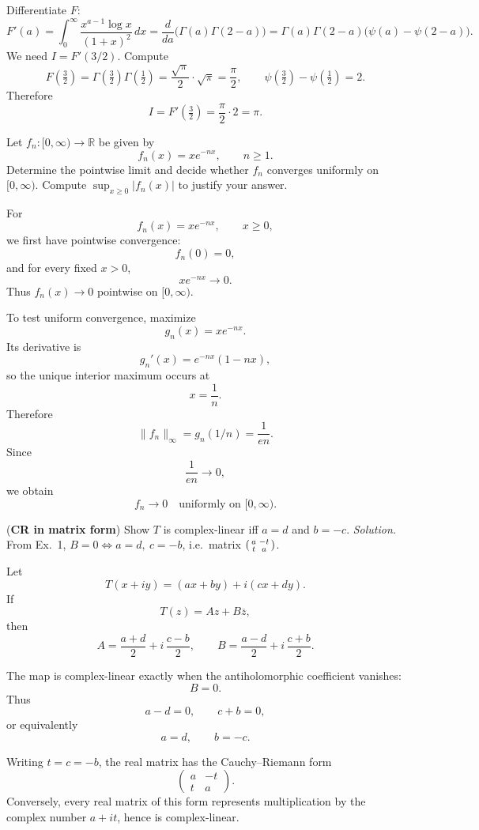 \begin{solution}
Differentiate \(F\):
\[
F'(a)=\int_{0}^{\infty}\frac{x^{a-1}\log x}{(1+x)^2}\,dx
=\frac{d}{da}\big(\Gamma(a)\Gamma(2-a)\big)
=\Gamma(a)\Gamma(2-a)\big(\psi(a)-\psi(2-a)\big).
\]
We need \(I=F'(3/2)\).  Compute
\[
F\!\left(\tfrac32\right)
=\Gamma\!\left(\tfrac32\right)\Gamma\!\left(\tfrac12\right)
=\frac{\sqrt\pi}{2}\cdot\sqrt\pi=\frac{\pi}{2},
\qquad
\psi\!\left(\tfrac32\right)-\psi\!\left(\tfrac12\right)=2.
\]
Therefore
\[
I=F'\!\left(\tfrac32\right)
=\frac{\pi}{2}\cdot 2
=\boxed{\pi}.
\]

\bigskip
\end{solution}

\begin{problem}[CP-IV-0050]
\label{prob:cp-iv-0050}
Let $f_n:[0,\infty)\to\mathbb R$ be given by
\[
f_n(x)=x e^{-nx},\qquad n\ge1.
\]
Determine the pointwise limit and decide whether $f_n$ converges uniformly
on $[0,\infty)$. Compute $\sup_{x\ge0}|f_n(x)|$ to justify your answer.
\end{problem}

\begin{solution}
For
\[
f_n(x)=xe^{-nx},
\qquad x\ge0,
\]
we first have pointwise convergence:
\[
f_n(0)=0,
\]
and for every fixed \(x>0\),
\[
xe^{-nx}\longrightarrow0.
\]
Thus \(f_n(x)\to0\) pointwise on \([0,\infty)\).

To test uniform convergence, maximize
\[
g_n(x)=xe^{-nx}.
\]
Its derivative is
\[
g_n'(x)=e^{-nx}(1-nx),
\]
so the unique interior maximum occurs at
\[
x=\frac1n.
\]
Therefore
\[
\|f_n\|_\infty
=
g_n(1/n)
=
\frac1{en}.
\]
Since
\[
\frac1{en}\longrightarrow0,
\]
we obtain
\[
\boxed{
f_n\to0\quad\text{uniformly on }[0,\infty).
}
\]
\end{solution}


\begin{problem}[CP-IV-0054]
\label{prob:cp-iv-0054}
\par\noindent\textbullet\quad (\textbf{CR in matrix form})
	Show $T$ is complex-linear iff $a=d$ and $b=-c$.
	\emph{Solution.} From Ex.\ 1, $B=0\iff a=d,\ c=-b$, i.e.\ matrix $\begin{psmallmatrix}a&-t\\ t&a\end{psmallmatrix}$.
\end{problem}

\begin{solution}
Let
\[
T(x+iy)=(ax+by)+i(cx+dy).
\]
If
\[
T(z)=Az+B\overline z,
\]
then
\[
A=\frac{a+d}{2}+i\,\frac{c-b}{2},
\qquad
B=\frac{a-d}{2}+i\,\frac{c+b}{2}.
\]

The map is complex-linear exactly when the antiholomorphic coefficient vanishes:
\[
B=0.
\]
Thus
\[
a-d=0,
\qquad
c+b=0,
\]
or equivalently
\[
\boxed{a=d,\qquad b=-c.}
\]

Writing \(t=c=-b\), the real matrix has the Cauchy--Riemann form
\[
\boxed{
\begin{pmatrix}
a&-t\\
t&a
\end{pmatrix}.
}
\]
Conversely, every real matrix of this form represents multiplication by the complex number \(a+it\), hence is complex-linear.
\end{solution}


